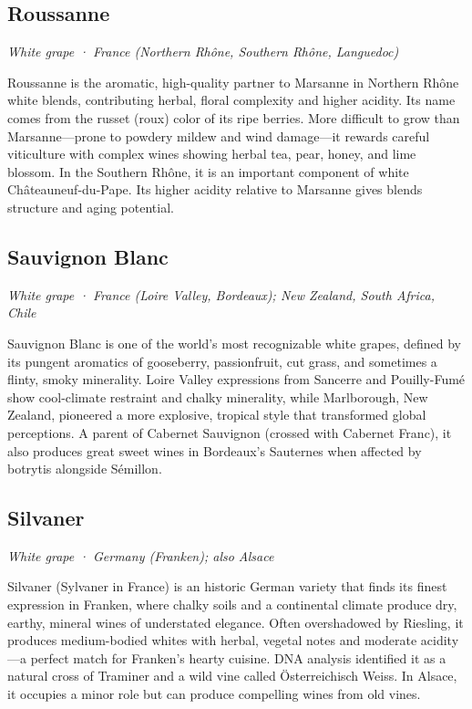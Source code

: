 \subsection*{Roussanne}
\textit{White grape · France (Northern Rhône, Southern Rhône, Languedoc)}\par\smallskip

Roussanne is the aromatic, high-quality partner to Marsanne in Northern Rhône white blends, contributing herbal, floral complexity and higher acidity. Its name comes from the russet (roux) color of its ripe berries. More difficult to grow than Marsanne—prone to powdery mildew and wind damage—it rewards careful viticulture with complex wines showing herbal tea, pear, honey, and lime blossom. In the Southern Rhône, it is an important component of white Châteauneuf-du-Pape. Its higher acidity relative to Marsanne gives blends structure and aging potential.

\subsection*{Sauvignon Blanc}
\textit{White grape · France (Loire Valley, Bordeaux); New Zealand, South Africa, Chile}\par\smallskip

Sauvignon Blanc is one of the world’s most recognizable white grapes, defined by its pungent aromatics of gooseberry, passionfruit, cut grass, and sometimes a flinty, smoky minerality. Loire Valley expressions from Sancerre and Pouilly-Fumé show cool-climate restraint and chalky minerality, while Marlborough, New Zealand, pioneered a more explosive, tropical style that transformed global perceptions. A parent of Cabernet Sauvignon (crossed with Cabernet Franc), it also produces great sweet wines in Bordeaux’s Sauternes when affected by botrytis alongside Sémillon.

\subsection*{Silvaner}
\textit{White grape · Germany (Franken); also Alsace}\par\smallskip

Silvaner (Sylvaner in France) is an historic German variety that finds its finest expression in Franken, where chalky soils and a continental climate produce dry, earthy, mineral wines of understated elegance. Often overshadowed by Riesling, it produces medium-bodied whites with herbal, vegetal notes and moderate acidity—a perfect match for Franken’s hearty cuisine. DNA analysis identified it as a natural cross of Traminer and a wild vine called Österreichisch Weiss. In Alsace, it occupies a minor role but can produce compelling wines from old vines.


